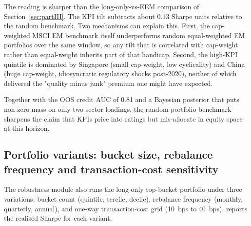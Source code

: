 The reading is sharper than the long-only-vs-EEM comparison of Section~\ref{sec:partIII}. The KPI tilt subtracts about $0.13$ Sharpe units relative to the random benchmark. Two mechanisms can explain this. First, the cap-weighted MSCI EM benchmark itself underperforms random equal-weighted EM portfolios over the same window, so any tilt that is correlated with cap-weight rather than equal-weight inherits part of that handicap. Second, the high-KPI quintile is dominated by Singapore (small cap-weight, low cyclicality) and China (huge cap-weight, idiosyncratic regulatory shocks post-2020), neither of which delivered the "quality minus junk" premium one might have expected.

Together with the OOS credit AUC of 0.81 and a Bayesian posterior that puts non-zero mass on only two sector loadings, the random-portfolio benchmark sharpens the claim that KPIs price into ratings but mis-allocate in equity space at this horizon.

\subsection{Portfolio variants: bucket size, rebalance frequency and transaction-cost sensitivity}

The robustness module also runs the long-only top-bucket portfolio under three variations: bucket count (quintile, tercile, decile), rebalance frequency (monthly, quarterly, annual), and one-way transaction-cost grid (10~bps to 40~bps).  reports the realised Sharpe for each variant.

